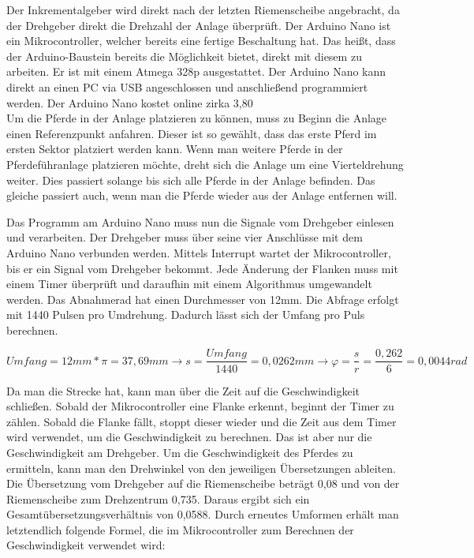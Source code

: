 Der Inkrementalgeber wird direkt nach der letzten Riemenscheibe angebracht, da der Drehgeber direkt die Drehzahl der Anlage überprüft. Der Arduino Nano ist ein Mikrocontroller, welcher bereits eine fertige Beschaltung hat. Das heißt, dass der Arduino-Baustein bereits die Möglichkeit bietet, direkt mit diesem zu arbeiten. Er ist mit einem Atmega 328p ausgestattet. Der Arduino Nano kann direkt an einen PC via \ac{USB} angeschlossen und anschließend programmiert werden. Der Arduino Nano kostet online zirka 3,80 \textsf{\texteuro} \cite{arduinoNano} \\
Um die Pferde in der Anlage platzieren zu können, muss zu Beginn die Anlage einen Referenzpunkt anfahren. Dieser ist so gewählt, dass das erste Pferd im ersten Sektor platziert werden kann. Wenn man weitere Pferde in der Pferdeführanlage platzieren möchte, dreht sich die Anlage um eine Vierteldrehung weiter. Dies passiert solange bis sich alle Pferde in der Anlage befinden. Das gleiche passiert auch, wenn man die Pferde wieder aus der Anlage entfernen will. \newline{}

Das Programm am Arduino Nano muss nun die Signale vom Drehgeber einlesen und verarbeiten. Der Drehgeber muss über seine vier Anschlüsse mit dem Arduino Nano verbunden werden.
Mittels Interrupt wartet der Mikrocontroller, bis er ein Signal vom Drehgeber bekommt. Jede Änderung der Flanken muss mit einem Timer überprüft und daraufhin mit einem Algorithmus umgewandelt werden. Das Abnahmerad hat einen Durchmesser von 12mm. Die Abfrage erfolgt mit 1440 Pulsen pro Umdrehung. Dadurch lässt sich der Umfang pro Puls berechnen.

\begin{center}
\begin{equation}
  \label{eq:7}
	Umfang = 12mm * \pi = 37,69mm \rightarrow s = \frac{Umfang}{1440} =  0,0262mm  \rightarrow \varphi = \frac{s}{r} = \frac{0,262}{6} = 0,0044rad
\end{equation} 
\end{center}

Da man die Strecke hat, kann man über die Zeit auf die Geschwindigkeit schließen. Sobald der Mikrocontroller eine Flanke erkennt, beginnt der Timer zu zählen. Sobald die Flanke fällt, stoppt dieser wieder und die Zeit aus dem Timer wird verwendet, um die Geschwindigkeit zu berechnen. Das ist aber nur die Geschwindigkeit am Drehgeber. Um die Geschwindigkeit des Pferdes zu ermitteln, kann man den Drehwinkel von den jeweiligen Übersetzungen ableiten. Die Übersetzung vom Drehgeber auf die Riemenscheibe beträgt 0,08 und von der Riemenscheibe zum Drehzentrum 0,735. Daraus ergibt sich ein Gesamtübersetzungsverhältnis von 0,0588. Durch erneutes Umformen erhält man letztendlich folgende Formel, die im Mikrocontroller zum Berechnen der Geschwindigkeit verwendet wird: 

